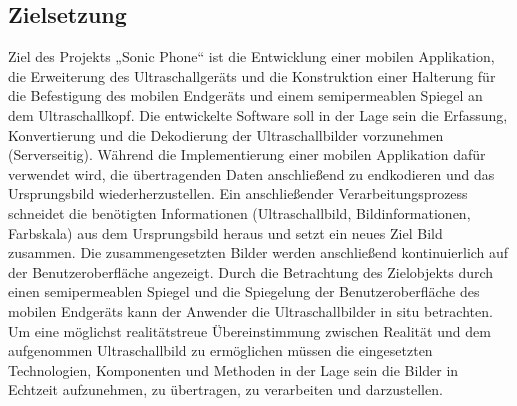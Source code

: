\subsection{Zielsetzung}
Ziel des Projekts „Sonic Phone“ ist die Entwicklung einer mobilen Applikation, die Erweiterung des Ultraschallgeräts und die Konstruktion einer Halterung für die Befestigung des mobilen Endgeräts und einem semipermeablen Spiegel an dem Ultraschallkopf. Die entwickelte Software soll in der Lage sein die Erfassung, Konvertierung und die Dekodierung der Ultraschallbilder vorzunehmen (Serverseitig). Während die Implementierung einer mobilen Applikation dafür verwendet wird, die übertragenden Daten  anschließend zu endkodieren und das Ursprungsbild wiederherzustellen. Ein anschließender Verarbeitungsprozess schneidet die benötigten Informationen (Ultraschallbild, Bildinformationen, Farbskala) aus dem Ursprungsbild heraus und setzt ein neues Ziel Bild zusammen. Die zusammengesetzten Bilder werden anschließend kontinuierlich auf der Benutzeroberfläche angezeigt. Durch die Betrachtung des Zielobjekts durch einen semipermeablen Spiegel und die Spiegelung der Benutzeroberfläche des mobilen Endgeräts kann der Anwender die Ultraschallbilder in situ betrachten. Um eine möglichst realitätstreue Übereinstimmung zwischen Realität und dem aufgenommen Ultraschallbild zu ermöglichen müssen die eingesetzten Technologien, Komponenten und Methoden in der Lage sein die Bilder in Echtzeit aufzunehmen, zu übertragen, zu verarbeiten und darzustellen.
